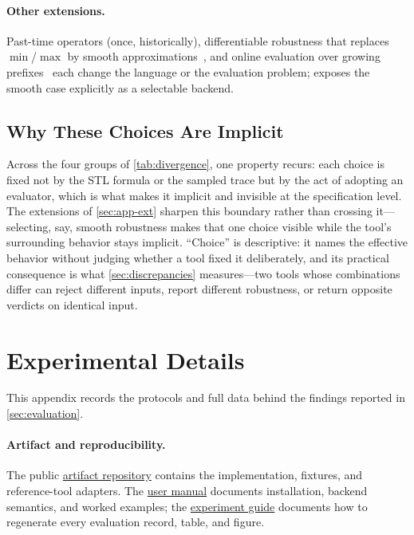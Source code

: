 \paragraph{Other extensions.}
Past-time operators (once, historically), differentiable robustness that
replaces $\min$/$\max$ by smooth
approximations~\cite{levenberg2020stlcg,pant2017smooth}, and online evaluation
over growing prefixes~\cite{deshmukh2017online} each change the language or the
evaluation problem; \tool exposes the smooth case explicitly as a selectable
backend.

\subsection{Why These Choices Are Implicit}

Across the four groups of \cref{tab:divergence}, one property recurs: each
choice is fixed not by the STL formula or the sampled trace but by the act of
adopting an evaluator, which is what makes it implicit and invisible at the
specification level. The extensions of \cref{sec:app-ext} sharpen this boundary
rather than crossing it---selecting, say, smooth robustness makes that one
choice visible while the tool's surrounding behavior stays implicit.
``Choice'' is descriptive: it names the effective behavior without judging
whether a tool fixed it deliberately, and its practical consequence is what
\cref{sec:discrepancies} measures---two tools whose combinations differ can
reject different inputs, report different robustness, or return opposite
verdicts on identical input.

\section{Experimental Details}
\label{sec:app-eval}

This appendix records the protocols and full data behind the findings
reported in \cref{sec:evaluation}.

\paragraph{Artifact and reproducibility.}
The public \href{https://github.com/midoriao/tidystl}{artifact repository}
contains the implementation, fixtures, and reference-tool adapters. The
\href{https://github.com/midoriao/tidystl/blob/main/packages/tidystl/docs/usage.md}{user manual}
documents installation, backend semantics, and worked examples; the
\href{https://github.com/midoriao/tidystl/blob/main/extra/experiments/README.md}{experiment guide}
documents how to regenerate every evaluation record, table, and figure.

